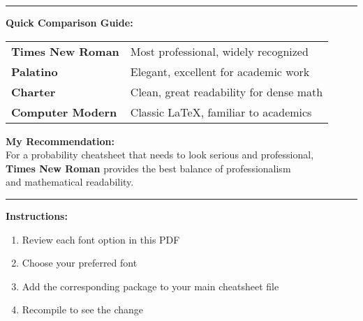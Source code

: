 \documentclass[10pt]{article}
\begin{document}
\vspace{1cm}

\begin{center}
\rule{\textwidth}{0.4pt}
\vspace{0.5cm}

\textbf{Quick Comparison Guide:}

\vspace{0.3cm}

\begin{tabular}{ll}
\textbf{Times New Roman} & Most professional, widely recognized \\
\textbf{Palatino} & Elegant, excellent for academic work \\
\textbf{Charter} & Clean, great readability for dense math \\
\textbf{Computer Modern} & Classic LaTeX, familiar to academics \\
\end{tabular}

\vspace{0.5cm}

\textbf{My Recommendation:} \\
For a probability cheatsheet that needs to look serious and professional, \\
\textbf{Times New Roman} provides the best balance of professionalism \\
and mathematical readability.

\vspace{0.3cm}
\rule{\textwidth}{0.4pt}
\end{center}

\vspace{1cm}

\textbf{Instructions:}
\begin{enumerate}
    \item Review each font option in this PDF
    \item Choose your preferred font
    \item Add the corresponding package to your main cheatsheet file
    \item Recompile to see the change
\end{enumerate}
\end{document}
